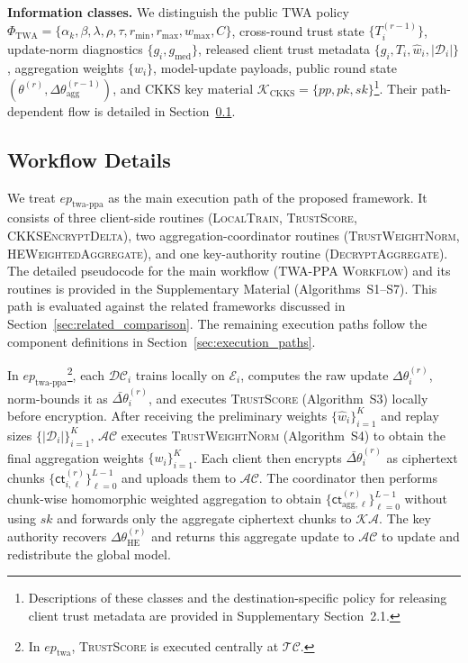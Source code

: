 \documentclass[journal]{IEEEtran}
\begin{document}
\noindent\textbf{Information classes.}
We distinguish the public TWA policy
$\Phi_{\mathrm{TWA}}=\{\alpha_k,\beta,\lambda,\rho,\tau,r_{\min},r_{\max},w_{\max},C\}$,
cross-round trust state $\{T_i^{(r-1)}\}$, update-norm diagnostics
$\{g_i,g_{\mathrm{med}}\}$, released client trust metadata
$\{g_i,T_i,\hat{w}_i,|\mathcal{D}_i|\}$, aggregation weights $\{w_i\}$,
model-update payloads, public round state $(\theta^{(r)},
\Delta\theta_{\mathrm{agg}}^{(r-1)})$, and CKKS key material
$\mathcal{K}_{\mathrm{CKKS}}=\{pp,pk,sk\}$\footnote{
Descriptions of these classes and the destination-specific policy for releasing
client trust metadata are provided in Supplementary Section~2.1.}.
Their path-dependent flow is detailed in Section~\ref{sec:workflow_details}.

\subsection{Workflow Details}\label{sec:workflow_details}

We treat $ep_{\mathrm{twa\text{-}ppa}}$ as the main execution
path of the proposed framework. It consists of three client-side routines
(\textsc{LocalTrain}, \textsc{TrustScore}, \textsc{CKKSEncryptDelta}),
two aggregation-coordinator routines (\textsc{TrustWeightNorm},
\textsc{HEWeightedAggregate}), and one key-authority routine
(\textsc{DecryptAggregate}). The detailed pseudocode for the main workflow
(\textsc{TWA-PPA Workflow}) and its routines is provided in the Supplementary
Material (Algorithms~S1--S7). This path is evaluated against the related
frameworks discussed in Section~\ref{sec:related_comparison}.
The remaining execution paths follow the component definitions in
Section~\ref{sec:execution_paths}.

In $ep_{\mathrm{twa\text{-}ppa}}$\footnote{In $ep_{\mathrm{twa}}$, \textsc{TrustScore} 
is executed centrally at $\mathcal{TC}$.}, each $\mathcal{DC}_i$ trains locally on
$\mathcal{E}_i$, computes the raw update $\Delta\theta_i^{(r)}$, norm-bounds it
as $\bar{\Delta\theta}_i^{(r)}$, and executes \textsc{TrustScore} (Algorithm~S3)
locally before encryption. After receiving the preliminary weights
$\{\hat{w}_i\}_{i=1}^{K}$ and replay sizes $\{|\mathcal{D}_i|\}_{i=1}^{K}$,
$\mathcal{AC}$ executes \textsc{TrustWeightNorm} (Algorithm~S4) to obtain the 
final aggregation weights $\{w_i\}_{i=1}^{K}$.
Each client then encrypts $\bar{\Delta\theta}_i^{(r)}$ as ciphertext chunks
$\{\mathsf{ct}_{i,\ell}^{(r)}\}_{\ell=0}^{L-1}$ and uploads them to $\mathcal{AC}$.
The coordinator then performs chunk-wise homomorphic weighted aggregation to
obtain $\{\mathsf{ct}_{\mathrm{agg},\ell}^{(r)}\}_{\ell=0}^{L-1}$ without
using $sk$ and forwards only the aggregate ciphertext chunks to $\mathcal{KA}$.
The key authority recovers $\Delta\theta_{\mathrm{HE}}^{(r)}$ and returns this
aggregate update to $\mathcal{AC}$ to update and redistribute the global model.
\end{document}
